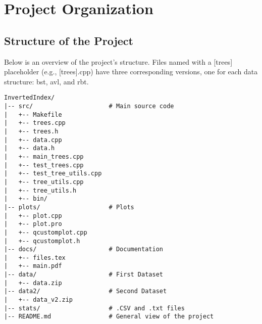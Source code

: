 \section{Project Organization}

\subsection{Structure of the Project}
Below is an overview of the project's structure. Files named with a [trees] placeholder (e.g., [trees].cpp) have three corresponding versions, one for each data structure: bst, avl, and rbt.


\begin{verbatim}
InvertedIndex/
|-- src/                     # Main source code
|   +-- Makefile          
|   +-- trees.cpp          
|   +-- trees.h 
|   +-- data.cpp
|   +-- data.h 
|   +-- main_trees.cpp 
|   +-- test_trees.cpp 
|   +-- test_tree_utils.cpp 
|   +-- tree_utils.cpp 
|   +-- tree_utils.h 
|   +-- bin/
|-- plots/                   # Plots
|   +-- plot.cpp
|   +-- plot.pro
|   +-- qcustomplot.cpp
|   +-- qcustomplot.h
|-- docs/                    # Documentation
|   +-- files.tex
|   +-- main.pdf
|-- data/                    # First Dataset
|   +-- data.zip
|-- data2/                   # Second Dataset
|   +-- data_v2.zip                        
|-- stats/                   # .CSV and .txt files 
|-- README.md                # General view of the project
\end{verbatim}